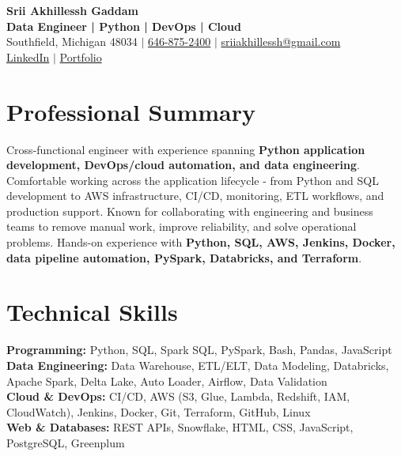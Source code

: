 \documentclass[letterpaper,10pt]{article}
\begin{document}
\fontsize{9.35pt}{10.45pt}\selectfont

\begin{center}
    {\LARGE \textbf{Srii Akhillessh Gaddam}} \\[-1pt]
    \textbf{Data Engineer | Python | DevOps | Cloud} \\[2pt]
    Southfield, Michigan 48034 $|$
    \href{tel:6468752400}{646-875-2400} $|$
    \href{mailto:sriiakhillessh@gmail.com}{sriiakhillessh@gmail.com} \\[1pt]
    \href{https://www.linkedin.com/in/srii-akhiilessh-gaddam-b48668191/}{LinkedIn} $|$
    \href{https://sriiakhillesshg.github.io/portfolio/}{Portfolio}
\end{center}
\vspace{-8pt}

\section{Professional Summary}
\small{Cross-functional engineer with experience spanning \textbf{Python application development, DevOps/cloud automation, and data engineering}. Comfortable working across the application lifecycle - from Python and SQL development to AWS infrastructure, CI/CD, monitoring, ETL workflows, and production support. Known for collaborating with engineering and business teams to remove manual work, improve reliability, and solve operational problems. Hands-on experience with \textbf{Python, SQL, AWS, Jenkins, Docker, data pipeline automation, PySpark, Databricks, and Terraform}.}

\section{Technical Skills}
\small{
\textbf{Programming:} Python, SQL, Spark SQL, PySpark, Bash, Pandas, JavaScript \\
\textbf{Data Engineering:} Data Warehouse, ETL/ELT, Data Modeling, Databricks, Apache Spark, Delta Lake, Auto Loader, Airflow, Data Validation \\
\textbf{Cloud \& DevOps:} CI/CD, AWS (S3, Glue, Lambda, Redshift, IAM, CloudWatch), Jenkins, Docker, Git, Terraform, GitHub, Linux \\
\textbf{Web \& Databases:} REST APIs, Snowflake, HTML, CSS, JavaScript, PostgreSQL, Greenplum
}
\end{document}
